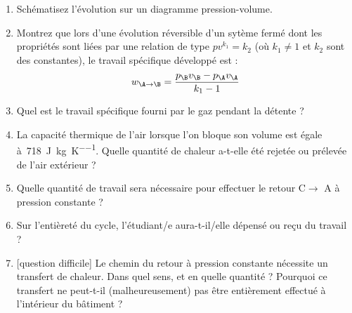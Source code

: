 	\begin{enumerate}
		\item Schématisez l’évolution sur un diagramme pression-volume.
		\item {Montrez que lors d’une évolution réversible d’un sytème fermé dont les propriétés sont liées par une relation de type $p v^{k_1} = k_2$ (où $k_1 \neq 1$ et $k_2$ sont des constantes), le travail spécifique développé est :
				\begin{equation*}
				w_{\A\to\B} = \frac{p_\B v_\B - p_\A v_\A}{k_1 - 1}
				\end{equation*}}
		\item Quel est le travail spécifique fourni par le gaz pendant la détente ?
		\item La capacité thermique de l’air lorsque l’on bloque son volume est égale à~\SI{718}{\joule\per\kilo\gram\per\kelvin}. Quelle quantité de chaleur a-t-elle été rejetée ou prélevée de l’air extérieur ?
		\item Quelle quantité de travail sera nécessaire pour effectuer le retour C$\to$ A à pression constante ?
		\item Sur l’entièreté du cycle, l’étudiant/e aura-t-il/elle dépensé ou reçu du travail ?
		\item {[question difficile]} Le chemin du retour à pression constante nécessite un transfert de chaleur. Dans quel sens, et en quelle quantité ? Pourquoi ce transfert ne peut-t-il (malheureusement) pas être entièrement effectué à l’intérieur du bâtiment ?
	\end{enumerate}



\exercisesolutionpage
\titreresultats

